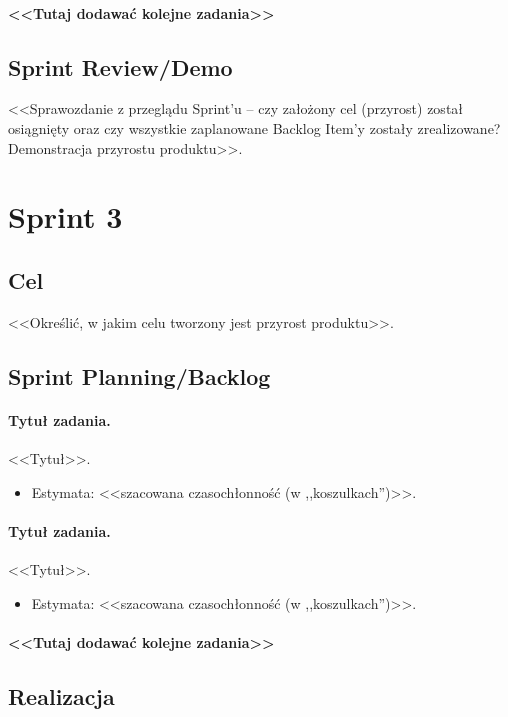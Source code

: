\documentclass[a4paper]{article}
\begin{document}
\paragraph{<<Tutaj dodawać kolejne zadania>>}


\subsection{Sprint Review/Demo}
<<Sprawozdanie z przeglądu Sprint'u -- czy założony cel (przyrost) został osiągnięty oraz czy wszystkie zaplanowane Backlog Item'y zostały zrealizowane? Demonstracja przyrostu produktu>>.

\section{Sprint 3}

\subsection{Cel} <<Określić, w jakim celu tworzony jest przyrost produktu>>.

\subsection{Sprint Planning/Backlog}

\paragraph{Tytuł zadania.} <<Tytuł>>.
\begin{itemize}
	\item Estymata: <<szacowana czasochłonność (w ,,koszulkach'')>>.
\end{itemize}

\paragraph{Tytuł zadania.} <<Tytuł>>.
\begin{itemize}
	\item Estymata: <<szacowana czasochłonność (w ,,koszulkach'')>>.
\end{itemize}

\paragraph{<<Tutaj dodawać kolejne zadania>>}

\subsection{Realizacja}
\end{document}
